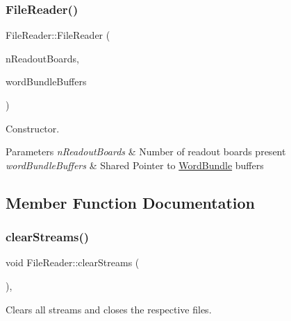 \subsubsection{\texorpdfstring{File\+Reader()}{FileReader()}}
{\footnotesize\ttfamily File\+Reader\+::\+File\+Reader (\begin{DoxyParamCaption}\item[{const unsigned int}]{n\+Readout\+Boards,  }\item[{std\+::array$<$ std\+::shared\+\_\+ptr$<$ \hyperlink{class_file_reader_ac755c1e271610c2c12a7fc5b55cc048b}{bundle\+Buffer} $>$, 4 $>$}]{word\+Bundle\+Buffers }\end{DoxyParamCaption})}



Constructor. 


\begin{DoxyParams}{Parameters}
{\em n\+Readout\+Boards} & Number of readout boards present \\
\hline
{\em word\+Bundle\+Buffers} & Shared Pointer to \hyperlink{class_word_bundle}{Word\+Bundle} buffers \\
\hline
\end{DoxyParams}


\subsection{Member Function Documentation}
\mbox{\label{class_file_reader_abf01d994f77beae0653de481ea739ebb}} 
\subsubsection{\texorpdfstring{clear\+Streams()}{clearStreams()}}
{\footnotesize\ttfamily void File\+Reader\+::clear\+Streams (\begin{DoxyParamCaption}{ }\end{DoxyParamCaption})\hspace{0.3cm}{\ttfamily [inline]}, {\ttfamily [private]}}



Clears all streams and closes the respective files. 

\mbox{\label{class_file_reader_a58b80f2c9c2ec8381527bdfca1008007}} 
